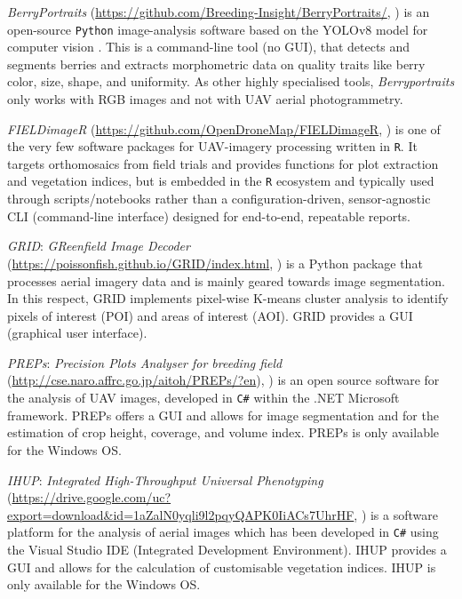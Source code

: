 \documentclass[drones,technicalnote,accept,pdftex,moreauthors]{Definitions/mdpi}
\begin{document}
\textit{BerryPortraits} (\url{https://github.com/Breeding-Insight/BerryPortraits/}, \cite{loarca2024berryportraits}) is an open-source \texttt{Python} image-analysis software based on the YOLOv8 model for computer vision \cite{varghese2024yolov8}. 
This is a command-line tool (no GUI), that detects and segments berries and extracts morphometric data on quality traits like berry color, size, shape, and uniformity. 
As other highly specialised tools, \textit{Berryportraits} only works with RGB images and not with UAV aerial photogrammetry.

\textit{FIELDimageR} (\url{https://github.com/OpenDroneMap/FIELDimageR}, \cite{matias_fieldimager_2020}) is one of the very few software packages for UAV-imagery processing written in \texttt{R}. It targets orthomosaics from field trials and provides functions for plot extraction and vegetation indices, but is embedded in the \texttt{R} ecosystem and typically used through scripts/notebooks rather than a configuration-driven, sensor-agnostic CLI (command-line interface) designed for end-to-end, repeatable reports.

\textit{GRID}: \textit{GReenfield Image Decoder} (\url{https://poissonfish.github.io/GRID/index.html},
\cite{ChenZhang2020}) is a Python package that processes aerial imagery data and is mainly geared towards image segmentation. In this respect, GRID implements pixel-wise K-means cluster analysis to identify pixels of interest (POI) and areas of interest (AOI). GRID provides a GUI (graphical user interface).

\textit{PREPs}: \textit{Precision Plots Analyser for breeding field} (\url{http://cse.naro.affrc.go.jp/aitoh/PREPs/?en}), \cite{itoh2024preps}) is an open source software for the analysis of UAV images, developed in \verb|C#| within the .NET Microsoft framework. PREPs offers a GUI and allows for image segmentation and for the estimation of crop height, coverage, and volume index. PREPs is only available for the Windows OS.

\textit{IHUP}: \textit{Integrated High-Throughput Universal Phenotyping} (\url{https://drive.google.com/uc?export=download&id=1aZalN0yqli9l2pqyQAPK0IiACs7UhrHF}, \cite{wang2024ihup}) is a software platform for the analysis of aerial images which has been developed in \verb|C#| using the Visual Studio IDE (Integrated Development Environment). IHUP provides a GUI and allows for the calculation of customisable vegetation indices. IHUP is only available for the Windows OS.

\bigskip
\end{document}
